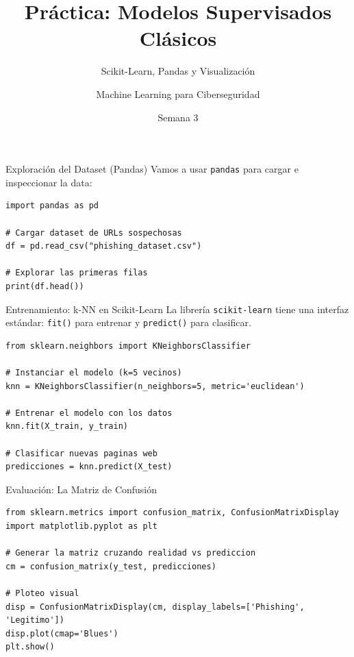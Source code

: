 \documentclass[aspectratio=169]{beamer}
\title{Práctica: Modelos Supervisados Clásicos}
\subtitle{Scikit-Learn, Pandas y Visualización}
\author{Machine Learning para Ciberseguridad}
\date{Semana 3}
\begin{document}
\begin{frame}
    \titlepage
\end{frame}

\begin{frame}[fragile]{Exploración del Dataset (Pandas)}
    Vamos a usar \texttt{pandas} para cargar e inspeccionar la data:
    \begin{lstlisting}
import pandas as pd

# Cargar dataset de URLs sospechosas
df = pd.read_csv("phishing_dataset.csv")

# Explorar las primeras filas
print(df.head())
    \end{lstlisting}
\end{frame}

\begin{frame}[fragile]{Entrenamiento: k-NN en Scikit-Learn}
    La librería \texttt{scikit-learn} tiene una interfaz estándar: \texttt{fit()} para entrenar y \texttt{predict()} para clasificar.
    \begin{lstlisting}
from sklearn.neighbors import KNeighborsClassifier

# Instanciar el modelo (k=5 vecinos)
knn = KNeighborsClassifier(n_neighbors=5, metric='euclidean')

# Entrenar el modelo con los datos
knn.fit(X_train, y_train)

# Clasificar nuevas paginas web
predicciones = knn.predict(X_test)
    \end{lstlisting}
\end{frame}

\begin{frame}[fragile]{Evaluación: La Matriz de Confusión}
    \begin{lstlisting}
from sklearn.metrics import confusion_matrix, ConfusionMatrixDisplay
import matplotlib.pyplot as plt

# Generar la matriz cruzando realidad vs prediccion
cm = confusion_matrix(y_test, predicciones)

# Ploteo visual
disp = ConfusionMatrixDisplay(cm, display_labels=['Phishing', 'Legitimo'])
disp.plot(cmap='Blues')
plt.show()
    \end{lstlisting}
\end{frame}
\end{document}
